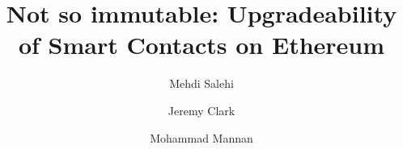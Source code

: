 \documentclass[envcountsect]{llncs}
\begin{document}
\frontmatter
\mainmatter

\title{Not so immutable: Upgradeability of Smart Contacts on Ethereum}
\author{Mehdi Salehi \and Jeremy Clark \and Mohammad Mannan}

\maketitle







%
%






\clearpage
\appendix




\end{document}
